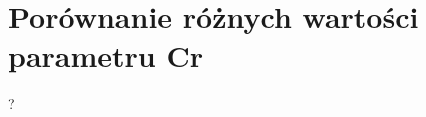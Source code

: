 \documentclass[a4paper,12pt]{article}
\theoremstyle{definition}
\begin{document}
\section{Porównanie różnych wartości parametru Cr}
?\\\\\\\\\\\\\\\\\\\\\\\\\\\\\\\\\\
\end{document}
